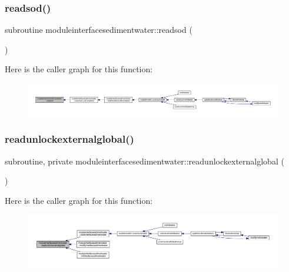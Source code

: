 \subsubsection{\texorpdfstring{readsod()}{readsod()}}
{\footnotesize\ttfamily subroutine moduleinterfacesedimentwater\+::readsod (\begin{DoxyParamCaption}{ }\end{DoxyParamCaption})\hspace{0.3cm}{\ttfamily [private]}}

Here is the caller graph for this function\+:\nopagebreak
\begin{figure}[H]
\begin{center}
\leavevmode
\includegraphics[width=350pt]{namespacemoduleinterfacesedimentwater_a86923875b20b0ddacafa24243a465222_icgraph}
\end{center}
\end{figure}
\mbox{\label{namespacemoduleinterfacesedimentwater_a3b4fc7f1a3bccb01412713961a441cf0}} 
\subsubsection{\texorpdfstring{readunlockexternalglobal()}{readunlockexternalglobal()}}
{\footnotesize\ttfamily subroutine, private moduleinterfacesedimentwater\+::readunlockexternalglobal (\begin{DoxyParamCaption}{ }\end{DoxyParamCaption})\hspace{0.3cm}{\ttfamily [private]}}

Here is the caller graph for this function\+:\nopagebreak
\begin{figure}[H]
\begin{center}
\leavevmode
\includegraphics[width=350pt]{namespacemoduleinterfacesedimentwater_a3b4fc7f1a3bccb01412713961a441cf0_icgraph}
\end{center}
\end{figure}
\mbox{\label{namespacemoduleinterfacesedimentwater_a6b368a5d3a18b3829f9bd022591d794a}} 

